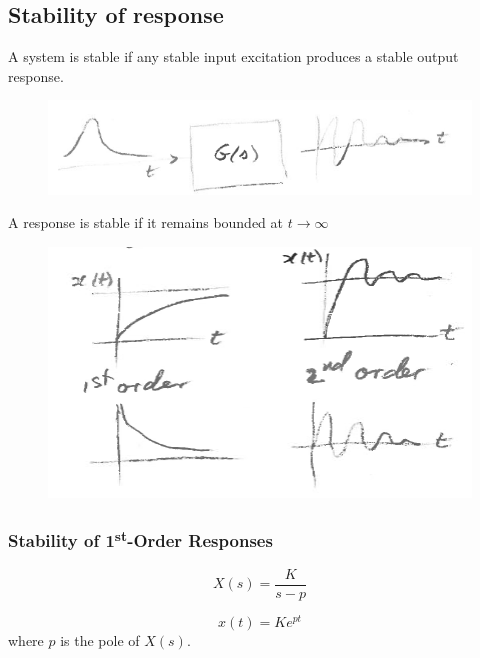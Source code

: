 \documentclass[12pt,letter]{article}
\begin{document}
%

\subsection{Stability of response}


A system is stable if any stable input excitation produces a stable output response. 

\begin{figure}[H]
	\centering
	\includegraphics[width=5.5in]{../figures/stable_system_block_diagram}
\end{figure}

A response is stable if it remains bounded at $t \rightarrow \infty$

	\begin{figure}[H]
	\centering
	\includegraphics[width=4.5in]{../figures/stable_responses}
\end{figure}

\subsubsection{Stability of 1\textsuperscript{st}-Order Responses}

\begin{equation}
X(s) = \frac{K}{s-p}
\end{equation}

\begin{equation}
x(t) = K e ^{p t}
\end{equation}
where $p$ is the pole of $X(s)$. 
\end{document}
